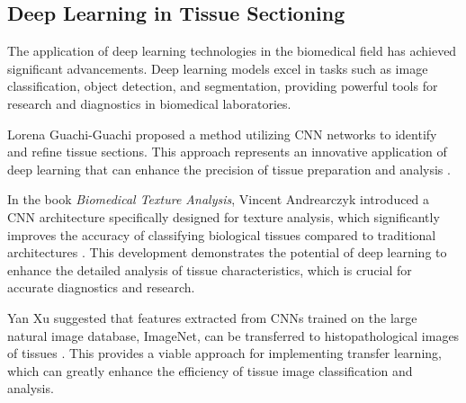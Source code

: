 






\subsection{Deep Learning in Tissue Sectioning}

The application of deep learning technologies in the biomedical field has achieved significant advancements. Deep learning models excel in tasks such as image classification, object detection, and segmentation, providing powerful tools for research and diagnostics in biomedical laboratories.

Lorena Guachi-Guachi proposed a method utilizing CNN networks to identify and refine tissue sections. This approach represents an innovative application of deep learning that can enhance the precision of tissue preparation and analysis \cite{LR.7}.

In the book \textit{Biomedical Texture Analysis}, Vincent Andrearczyk introduced a CNN architecture specifically designed for texture analysis, which significantly improves the accuracy of classifying biological tissues compared to traditional architectures \cite{LR.8}. This development demonstrates the potential of deep learning to enhance the detailed analysis of tissue characteristics, which is crucial for accurate diagnostics and research.

Yan Xu suggested that features extracted from CNNs trained on the large natural image database, ImageNet, can be transferred to histopathological images of tissues \cite{LR.9}. This provides a viable approach for implementing transfer learning, which can greatly enhance the efficiency of tissue image classification and analysis.

